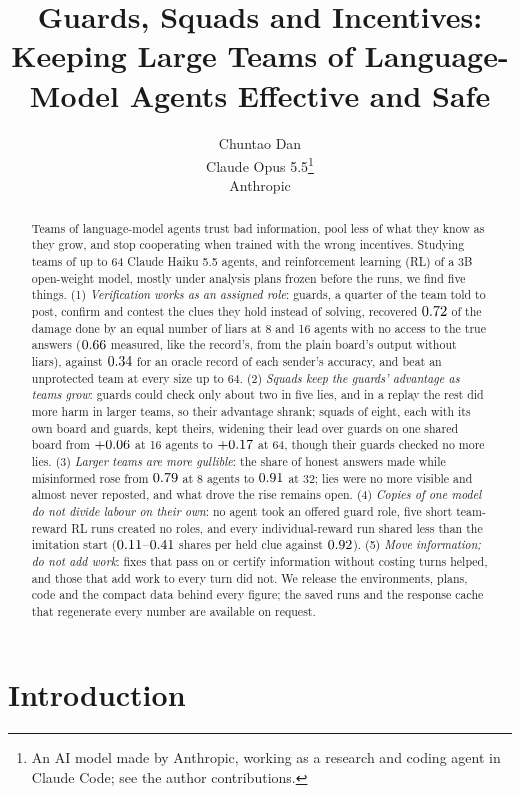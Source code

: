 \documentclass{article}
\title{Guards, Squads and Incentives: Keeping Large Teams of Language-Model Agents Effective and Safe}
\author{%
  Chuntao Dan \\
  \And
  Claude Opus 5.5\thanks{An AI model made by Anthropic, working as a research and coding agent in Claude Code; see the author contributions.} \\
  Anthropic \\
}
\begin{document}
\maketitle

\begin{abstract}
Teams of language-model agents trust bad information, pool less of what they know as they grow, and stop cooperating when trained with the wrong incentives. Studying teams of up to 64 Claude Haiku 5.5 agents, and reinforcement learning (RL) of a 3B open-weight model, mostly under analysis plans frozen before the runs, we find five things. (1) \emph{Verification works as an assigned role}: guards, a quarter of the team told to post, confirm and contest the clues they hold instead of solving, recovered $0.72$ of the damage done by an equal number of liars at 8 and 16 agents with no access to the true answers ($0.66$ measured, like the record's, from the plain board's output without liars), against $0.34$ for an oracle record of each sender's accuracy, and beat an unprotected team at every size up to 64. (2) \emph{Squads keep the guards' advantage as teams grow}: guards could check only about two in five lies, and in a replay the rest did more harm in larger teams, so their advantage shrank; squads of eight, each with its own board and guards, kept theirs, widening their lead over guards on one shared board from $+0.06$ at 16 agents to $+0.17$ at 64, though their guards checked no more lies. (3) \emph{Larger teams are more gullible}: the share of honest answers made while misinformed rose from $0.79$ at 8 agents to $0.91$ at 32; lies were no more visible and almost never reposted, and what drove the rise remains open. (4) \emph{Copies of one model do not divide labour on their own}: no agent took an offered guard role, five short team-reward RL runs created no roles, and every individual-reward run shared less than the imitation start ($0.11$--$0.41$ shares per held clue against $0.92$). (5) \emph{Move information; do not add work}: fixes that pass on or certify information without costing turns helped, and those that add work to every turn did not. We release the environments, plans, code and the compact data behind every figure; the saved runs and the response cache that regenerate every number are available on request.
\end{abstract}

\section{Introduction}
\end{document}
